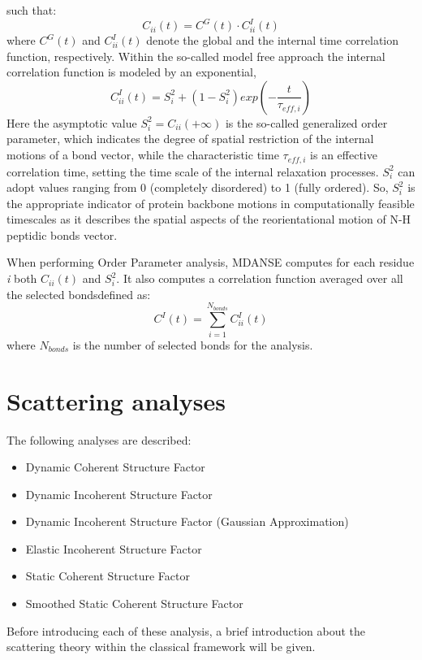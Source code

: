 \documentclass[a4paper,11pt]{article}
\begin{document}
such that:
\begin{equation}
C_{ii}(t) = C^G(t) \cdot C^I_{ii}(t)
\end{equation}
where $C^G(t)$ and $C^I_{ii}(t)$ denote the global and the internal time correlation function, respectively. Within
the so-called model free approach \cite{Szabo:1982,Szabo:1982bis} the internal correlation function is modeled by an 
exponential, 
\begin{equation}
C^I_{ii}(t) = S^2_i +(1 - S^2_i)exp\left(-\frac{t}{\tau_{eff,i}}\right)
\end{equation}
Here the asymptotic value $S^2_i =C_{ii}(+\infty)$ is the so-called generalized order parameter, which indicates the 
degree of spatial restriction of the internal motions of a bond vector, while the characteristic time $\tau_{eff,i}$ is an 
effective correlation time, setting the time scale of the internal relaxation processes. $S^2_i$ can adopt values ranging from 
0 (completely disordered) to 1 (fully ordered). So, $S^2_i$ is the appropriate indicator of protein backbone motions in 
computationally feasible timescales as it describes the spatial aspects of the reorientational motion of N-H peptidic 
bonds vector.

When performing Order Parameter analysis, \gls{MDANSE} computes for each residue \textit{i} both $C_{ii}(t)$ and $S^2_i$. 
It also computes a correlation function averaged over all the selected bondsdefined as:
\begin{equation}
\label{eq:op_cii_avg}
C^I(t) = \sum_{i = 1}^{N_{bonds}} C^I_{ii}(t)
\end{equation}
where $N_{bonds}$ is the number of selected bonds for the analysis.

\section{Scattering analyses}
\label{scattering_menu}
The following analyses are described:
\begin{itemize}
\item Dynamic Coherent Structure Factor
\item Dynamic Incoherent Structure Factor
\item Dynamic Incoherent Structure Factor (Gaussian Approximation)
\item Elastic Incoherent Structure Factor
\item Static Coherent Structure Factor
\item Smoothed Static Coherent Structure Factor
\end{itemize}
Before introducing each of these analysis, a brief introduction about the scattering theory within the classical framework will be given.
\end{document}
